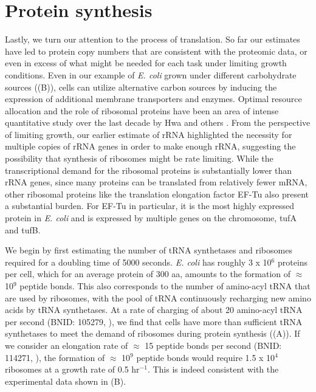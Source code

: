 \section{Protein synthesis}

Lastly, we turn our attention to the process of translation. So far our
estimates have led to protein copy numbers that are consistent with the
proteomic data, or even in excess of what might be needed for each task under
limiting growth conditions. Even in our example of \textit{E. coli} grown under
different carbohydrate sources ((B)), cells can utilize
alternative carbon sources by inducing the expression of additional membrane
transporters and enzymes. Optimal resource allocation and the role of ribosomal
proteins have been an area of intense quantitative study over the last decade by
Hwa and others \citep{scott2010, hui2015}. From the perspective of limiting
growth, our earlier estimate of rRNA highlighted the necessity for multiple
copies of rRNA genes in order to make enough rRNA, suggesting the possibility
that synthesis of ribosomes might be rate limiting. While the transcriptional
demand for  the ribosomal proteins is substantially lower than rRNA genes, since
many proteins can be translated from relatively fewer mRNA, other ribosomal
proteins like the translation elongation factor EF-Tu also present a substantial
burden. For EF-Tu  in particular, it is the most highly expressed protein in
\textit{E. coli} and  is expressed by multiple genes on the chromosome, tufA and
tufB.



We begin by first estimating the number of tRNA synthetases and ribosomes
required for  a doubling time of 5000 seconds.  \textit{E. coli} has roughly 3 x
10$^6$ proteins per cell, which for an average protein of 300 aa, amounts to the formation
of $\approx$ 10$^9$ peptide bonds. This also corresponds to the
number of amino-acyl tRNA that are used by ribosomes, with the pool of tRNA continuously
recharging new amino acids by tRNA synthetases. At a rate of charging of
about 20 amino-acyl tRNA per second (BNID: 105279, \cite{milo2010}), we find
that cells have more than sufficient tRNA synthetases to meet the demand of
ribosomes during  protein synthesis ((A)).
If we consider an elongation rate of $\approx$ 15 peptide bonds per second
(BNID: 114271, \cite{milo2010, dai2016}), the formation of $\approx$ 10$^9$
peptide bonds would require 1.5 x 10$^4$ ribosomes at a growth rate of 0.5
hr$^{-1}$. This is indeed consistent with the experimental data shown in
(B).

